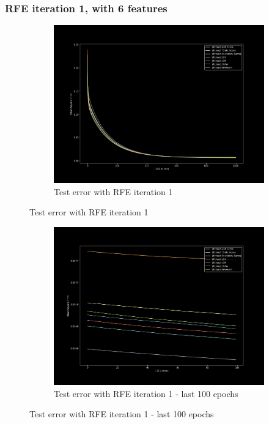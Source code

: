 \subsubsection{RFE iteration 1, with 6 features}
\begin{figure}[H]
    \begin{subfigure}{1\textwidth}
        \centering
        \includegraphics[width=0.8\linewidth]{assets/plots2/part3_2.png}
        \caption{Test error with RFE iteration 1}
        \label{fig:rfe1}
    \end{subfigure} 
\end{figure}
\begin{figure}[H]
    \ContinuedFloat
    \begin{subfigure}{1\textwidth}
        \centering
        \includegraphics[width=0.8\linewidth]{assets/plots2/part3_3.png}
        \caption{Test error with RFE iteration 1 - last 100 epochs}
        \label{fig:rfe1_zoom}
    \end{subfigure}
\end{figure}

